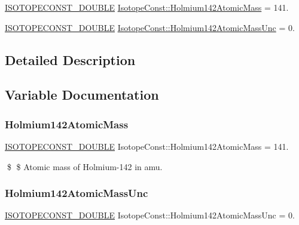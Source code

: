 \begin{DoxyCompactItemize}
\item 
\mbox{\hyperlink{group___isotope_const-_macros_ga8f45a7272ce02c0b4c65c44636ed719a}{I\+S\+O\+T\+O\+P\+E\+C\+O\+N\+S\+T\+\_\+\+D\+O\+U\+B\+LE}} \mbox{\hyperlink{group___isotope_const-_holmium-_ho142_gaeb299d0b33ba340d46ffbea8fd9bfc4b}{Isotope\+Const\+::\+Holmium142\+Atomic\+Mass}} = 141.
\item 
\mbox{\hyperlink{group___isotope_const-_macros_ga8f45a7272ce02c0b4c65c44636ed719a}{I\+S\+O\+T\+O\+P\+E\+C\+O\+N\+S\+T\+\_\+\+D\+O\+U\+B\+LE}} \mbox{\hyperlink{group___isotope_const-_holmium-_ho142_gadc3c139527b74e3f28cc03939bd854fa}{Isotope\+Const\+::\+Holmium142\+Atomic\+Mass\+Unc}} = 0.
\end{DoxyCompactItemize}


\subsection{Detailed Description}


\subsection{Variable Documentation}
\mbox{\label{group___isotope_const-_holmium-_ho142_gaeb299d0b33ba340d46ffbea8fd9bfc4b}} 
\subsubsection{\texorpdfstring{Holmium142\+Atomic\+Mass}{Holmium142AtomicMass}}
{\footnotesize\ttfamily \mbox{\hyperlink{group___isotope_const-_macros_ga8f45a7272ce02c0b4c65c44636ed719a}{I\+S\+O\+T\+O\+P\+E\+C\+O\+N\+S\+T\+\_\+\+D\+O\+U\+B\+LE}} Isotope\+Const\+::\+Holmium142\+Atomic\+Mass = 141.}

\$ \$ Atomic mass of Holmium-\/142 in amu. \mbox{\label{group___isotope_const-_holmium-_ho142_gadc3c139527b74e3f28cc03939bd854fa}} 
\subsubsection{\texorpdfstring{Holmium142\+Atomic\+Mass\+Unc}{Holmium142AtomicMassUnc}}
{\footnotesize\ttfamily \mbox{\hyperlink{group___isotope_const-_macros_ga8f45a7272ce02c0b4c65c44636ed719a}{I\+S\+O\+T\+O\+P\+E\+C\+O\+N\+S\+T\+\_\+\+D\+O\+U\+B\+LE}} Isotope\+Const\+::\+Holmium142\+Atomic\+Mass\+Unc = 0.}

